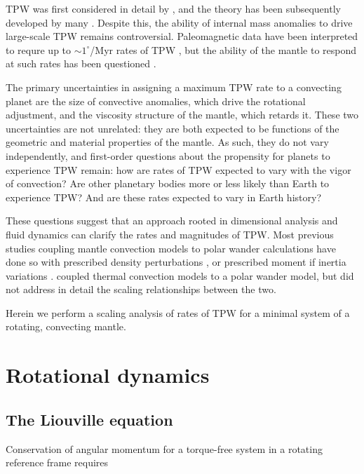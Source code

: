 \documentclass[extra,mreferee]{gji}
\begin{document}
TPW was first considered in detail by \citet{darwin1887influence}, and the theory has been subsequently developed by many \citep[e.g.][]{munk1960rotation, goldreich1969some, ricard1993polar}. 
Despite this, the ability of internal mass anomalies to drive large-scale TPW remains controversial. 
Paleomagnetic data have been interpreted to requre up to $\sim 1^\circ$/Myr rates of TPW \citep{mitchell2011sutton}, but the ability of the mantle to respond at such rates has been questioned \citep{tsai2007theoretical}.

The primary uncertainties in assigning a maximum TPW rate to a convecting planet are the size of convective anomalies, which drive the rotational adjustment, and the viscosity structure of the mantle, which retards it. 
These two uncertainties are not unrelated: they are both expected to be functions of the geometric and material properties of the mantle.
As such, they do not vary independently, and first-order questions about the propensity for planets to experience TPW remain: how are rates of TPW expected to vary with the vigor of convection? 
Are other planetary bodies more or less likely than Earth to experience TPW?  And are these rates expected to vary in Earth history?

These questions suggest that an approach rooted in dimensional analysis and fluid dynamics can clarify the rates and magnitudes of TPW.
Most previous studies coupling mantle convection models to polar wander calculations have done so with prescribed density perturbations \citep[e.g.][]{greff2004upwelling}, or prescribed moment if inertia variations \citep[e.g.][]{tsai2007theoretical, creveling2012mechanisms}. 
\citet{richards1999polar} coupled thermal convection models to a polar wander model, but did not address in detail the scaling relationships between the two.

Herein we perform a scaling analysis of rates of TPW for a minimal system of a rotating, convecting mantle.

\section{Rotational dynamics}

\subsection{The Liouville equation}
Conservation of angular momentum for a torque-free system in a rotating reference frame requires
\end{document}
